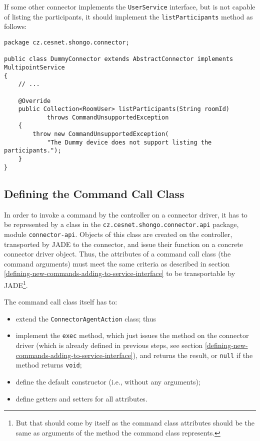 If some other connector implements the \texttt{UserService} interface, but is not capable of listing the participants, it should implement the \texttt{listParticipants} method as follows:

{ \small
\begin{verbatim}
package cz.cesnet.shongo.connector;

public class DummyConnector extends AbstractConnector implements MultipointService
{
    // ...

    @Override
    public Collection<RoomUser> listParticipants(String roomId)
            throws CommandUnsupportedException
    {
        throw new CommandUnsupportedException(
            "The Dummy device does not support listing the participants.");
    }
}
\end{verbatim}
}


\subsection{Defining the Command Call Class}

In order to invoke a command by the controller on a connector driver, it has to be represented by a class in the \texttt{cz.cesnet.shongo.connector.api} package, module \texttt{connector-api}. Objects of this class are created on the controller, transported by JADE to the connector, and issue their function on a concrete connector driver object. Thus, the attributes of a command call class (the command arguments) must meet the same criteria as described in section \ref{defining-new-commands-adding-to-service-interface} to be transportable by JADE\footnote{But that should come by itself as the command class attributes should be the same as arguments of the method the command class represents.}.

The command call class itself has to:
\begin{itemize}
\item extend the \texttt{ConnectorAgentAction} class; thus
\item implement the \texttt{exec} method, which just issues the method on the connector driver (which is already defined in previous steps, see section \ref{defining-new-commands-adding-to-service-interface}), and returns the result, or \texttt{null} if the method returns \texttt{void};
\item define the default constructor (i.e., without any arguments);
\item define getters and setters for all attributes.
\end{itemize}

